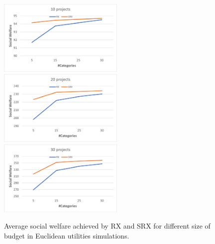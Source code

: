 \documentclass[runningheads]{llncs}
\begin{document}
\begin{subappendices}
\begin{figure}[t]
\begin{center}
\includegraphics[width=6cm]{simulation/unit_cost_sw_10.png}
\includegraphics[width=6cm]{simulation/unit_cost_sw_20.png}
\includegraphics[width=6cm]{simulation/unit_cost_sw_30.png}
\caption{Average social welfare achieved by RX and SRX for different size of budget in Euclidean utilities simulations.
}\label{fig:sw_all1}
\end{center}
\end{figure}


\end{subappendices}
\end{document}
